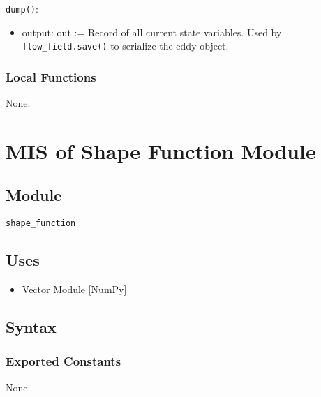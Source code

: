 \documentclass[12pt, titlepage]{article}
\begin{document}
\noindent \texttt{dump()}:
\begin{itemize}
\item output: out := Record of all current state variables. Used by \texttt{flow\_field.save()} to serialize the eddy object.
\end{itemize}

\subsubsection{Local Functions}

None.


\newpage
\section{MIS of Shape Function Module} \label{mShape}

\subsection{Module}
\texttt{shape\_function}

\subsection{Uses}
\begin{itemize}
\item Vector Module [NumPy]
\end{itemize}

\subsection{Syntax}

\subsubsection{Exported Constants}
None.
\end{document}
